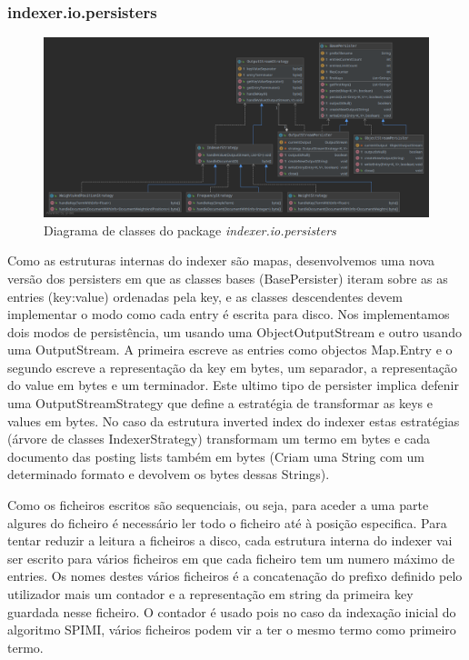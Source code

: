 \documentclass[12pt]{article}
\begin{document}
\subsubsection{indexer.io.persisters}
\begin{figure}[H]
  \center
  \includegraphics[width=\linewidth]{packages_indexer_io_persisters.png}
  \caption{Diagrama de classes do package \it indexer.io.persisters}
\end{figure}

Como as estruturas internas do indexer são mapas, desenvolvemos uma
nova versão dos persisters em que as classes bases (BasePersister)
iteram sobre as as entries (key:value) ordenadas pela key, e as
classes descendentes devem implementar o modo como cada entry é
escrita para disco. Nos implementamos dois modos de persistência,
um usando uma ObjectOutputStream e outro usando uma OutputStream.
A primeira escreve as entries como objectos Map.Entry e o segundo
escreve a representação da key em bytes, um separador, a
representação do value em bytes e um terminador. Este ultimo tipo
de persister implica defenir uma OutputStreamStrategy que define
a estratégia de transformar as keys e values em bytes. No caso da
estrutura inverted index do indexer estas estratégias (árvore de
classes IndexerStrategy) transformam um termo em bytes e cada
documento das posting lists também em bytes (Criam uma String
com um determinado formato e devolvem os bytes dessas Strings).

Como os ficheiros escritos são sequenciais, ou seja, para aceder
a uma parte algures do ficheiro é necessário ler todo o ficheiro
até à posição especifica. Para tentar reduzir a leitura a ficheiros
a disco, cada estrutura interna do indexer vai ser escrito para
vários ficheiros em que cada ficheiro tem um numero máximo de
entries. Os nomes destes vários ficheiros é a concatenação do
prefixo definido pelo utilizador mais um contador e a representação
em string da primeira key guardada nesse ficheiro. O contador é
usado pois no caso da indexação inicial do algoritmo SPIMI, vários
ficheiros podem vir a ter o mesmo termo como primeiro termo.
\end{document}
